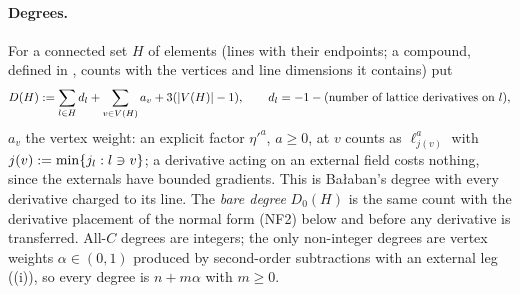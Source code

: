\paragraph{Degrees.}
For a connected set $H$ of elements (lines with their endpoints; a compound, defined in , counts with the vertices and line dimensions it contains) put
\[
D(H):=\sum_{l\in H}d_l+\sum_{v\in V(H)}a_v+3(|V(H)|-1),\qquad d_l=-1-(\text{number of lattice derivatives on }l),
\]
$a_v$ the vertex weight: an explicit factor $\eta'^a$, $a\ge0$, at $v$ counts as $\ell_{j(v)}^a$ with $j(v):=\min\{j_l:l\ni v\}$; a derivative acting on an external field costs nothing, since the externals have bounded gradients. This is Ba{\l}aban's degree \cite[(2.1)--(2.3)]{Ba3} with every derivative charged to its line. The \emph{bare degree} $D_0(H)$ is the same count with the derivative placement of the normal form (NF2) below and before any derivative is transferred. All-$C$ degrees are integers; the only non-integer degrees are vertex weights $\alpha\in(0,1)$ produced by second-order subtractions with an external leg ((i)), so every degree is $n+m\alpha$ with $m\ge0$.

